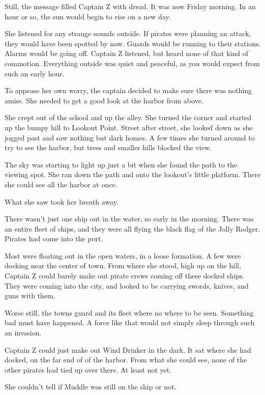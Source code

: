 \documentclass[12pt]{extbook}
\begin{document}
  Still, the message filled Captain Z with dread. It was now Friday
  morning. In an hour or so, the sun would begin to rise on a new day.
  
  She listened for any strange sounds outside. If pirates were planning an
  attack, they would have been spotted by now. Guards would be running to
  their stations. Alarms would be going off. Captain Z listened, but heard
  none of that kind of commotion. Everything outside was quiet and
  peaceful, as you would expect from such an early hour.
  
  To appease her own worry, the captain decided to make sure there was
  nothing amiss. She needed to get a good look at the harbor from above.
  
  She crept out of the school and up the alley. She turned the corner and
  started up the bumpy hill to Lookout Point. Street after street, she
  looked down as she jogged past and saw nothing but dark homes. A few
  times she turned around to try to see the harbor, but trees and smaller
  hills blocked the view.
  
  The sky was starting to light up just a bit when she found the path to
  the viewing spot. She ran down the path and onto the lookout's little
  platform. There she could see all the harbor at once.
  
  What she saw took her breath away.
  
  There wasn't just one ship out in the water, so early in the morning.
  There was an entire fleet of ships, and they were all flying the black
  flag of the Jolly Rodger. Pirates had come into the port.
  
  Most were floating out in the open waters, in a loose formation. A few
  were docking near the center of town. From where she stood, high up on
  the hill, Captain Z could barely make out pirate crews coming off these
  docked ships. They were coming into the city, and looked to be carrying
  swords, knives, and guns with them.
  
  Worse still, the towns guard and its fleet where no where to be seen.
  Something bad must have happened. A force like that would not simply
  sleep through such an invasion.
  
  Captain Z could just make out Wind Drinker in the dark. It sat where she
  had docked, on the far end of of the harbor. From what she could see,
  none of the other pirates had tied up over there. At least not yet.
  
  She couldn't tell if Muddle was still on the ship or not.
  
\end{document}
